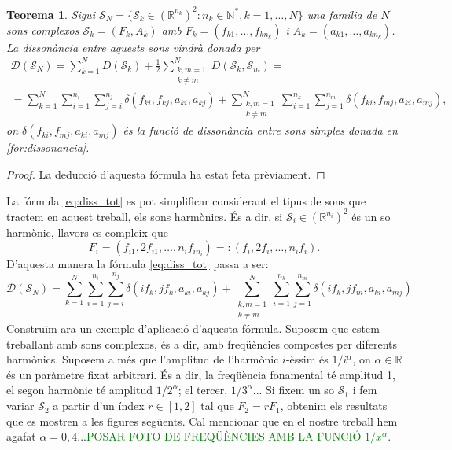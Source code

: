 \documentclass{article}
\theoremstyle{math}
\newtheorem{theorem}[definition]{Teorema}
\newcommand{\0}{\ensuremath{\vb{0}}}
\begin{document}
\begin{theorem}
Sigui $\mathcal{S}_N=\{\mathcal{S}_k\in(\mathbb{R}^{n_k})^2:n_k\in\mathbb{N}^*,k=1,\ldots, N\}$ una família de $N$ sons complexos $\mathcal{S}_k=(F_k, A_k)$ amb $F_k=(f_{k1},\ldots, f_{kn_k})$ i $A_k=(a_{k1},\ldots, a_{kn_k})$. La dissonància entre aquests sons vindrà donada per 
\begin{multline}
    \mathcal{D}(\mathcal{S}_N)=\sum_{k=1}^ND(\mathcal{S}_k)+\frac{1}{2}\sum_{\substack{k, m=1\\ k\ne m}}^ND(\mathcal{S}_k, \mathcal{S}_m)=\\=\sum_{k=1}^N\sum_{i=1}^{n_i}\sum_{j=i}^{n_j}\delta(f_{ki}, f_{kj}, a_{ki}, a_{kj})+\sum_{\substack{k, m=1\\ k\ne m}}^N\sum_{i=1}^{n_k}\sum_{j=1}^{n_m}\delta(f_{ki}, f_{mj}, a_{ki}, a_{mj}),
    \label{eq:diss_tot}
\end{multline}
on $\delta(f_{ki}, f_{mj}, a_{ki}, a_{mj})$ és la funció de dissonància entre sons simples donada en \eqref{for:dissonancia}.
\end{theorem}
\begin{proof}
La deducció d'aquesta fórmula ha estat feta prèviament.
\end{proof}
La fórmula \eqref{eq:diss_tot} es pot simplificar considerant el tipus de sons que tractem en aquest treball, els sons harmònics. És a dir, si $\mathcal{S}_i\in(\mathbb{R}^{n_i})^2$ és un so harmònic, llavors es compleix que $$F_i=(f_{i1},2f_{i1},\ldots, n_if_{in_i})=:(f_i,2f_i,\ldots, n_if_i).$$ D'aquesta manera la fórmula \eqref{eq:diss_tot} passa a ser: 
\begin{equation}
    \mathcal{D}(\mathcal{S}_N)=\sum_{k=1}^N\sum_{i=1}^{n_i}\sum_{j=i}^{n_j}\delta(if_k, jf_k, a_{ki}, a_{kj})+\sum_{\substack{k, m=1\\ k\ne m}}^N\sum_{i=1}^{n_k}\sum_{j=1}^{n_m}\delta(if_k, jf_m, a_{ki}, a_{mj})
\end{equation}
Construïm ara un exemple d'aplicació d'aquesta fórmula. Suposem que estem treballant amb sons complexos, és a dir, amb freqüències compostes per diferents harmònics. Suposem a més que l'amplitud de l'harmònic $i$-èssim és $1/i^\alpha$, on $\alpha\in\mathbb{R}$ és un paràmetre fixat arbitrari. És a dir, la freqüència fonamental té amplitud 1, el segon harmònic té amplitud $1/2^\alpha$; el tercer, $1/3^\alpha$... Si fixem un so $\mathcal{S}_1$ i fem variar $\mathcal{S}_2$ a partir d'un índex $r\in[1,2]$ tal que $F_2=rF_1$, obtenim els resultats que es mostren a les figures següents. Cal mencionar que en el nostre treball hem agafat $\alpha=0,4$...\textcolor{green}{POSAR FOTO DE FREQÜÈNCIES AMB LA FUNCIÓ $1/x^\alpha$}.
\end{document}
